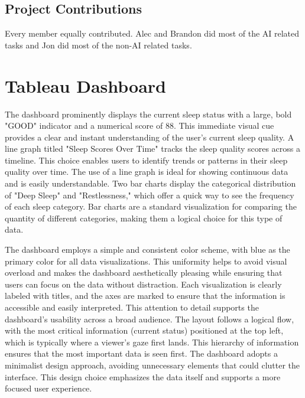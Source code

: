 \documentclass[10pt]{extarticle}
\begin{document}
\subsection{Project Contributions}

Every member equally contributed. Alec and Brandon did most of the AI related tasks and Jon did most of the non-AI related tasks.

\section{Tableau Dashboard}

The dashboard prominently displays the current sleep status with a large, bold "GOOD" indicator and a numerical score of 88. This immediate visual cue provides a clear and instant understanding of the user's current sleep quality. A line graph titled "Sleep Scores Over Time" tracks the sleep quality scores across a timeline. This choice enables users to identify trends or patterns in their sleep quality over time. The use of a line graph is ideal for showing continuous data and is easily understandable. Two bar charts display the categorical distribution of "Deep Sleep" and "Restlessness," which offer a quick way to see the frequency of each sleep category. Bar charts are a standard visualization for comparing the quantity of different categories, making them a logical choice for this type of data.

The dashboard employs a simple and consistent color scheme, with blue as the primary color for all data visualizations. This uniformity helps to avoid visual overload and makes the dashboard aesthetically pleasing while ensuring that users can focus on the data without distraction. Each visualization is clearly labeled with titles, and the axes are marked to ensure that the information is accessible and easily interpreted. This attention to detail supports the dashboard's usability across a broad audience. The layout follows a logical flow, with the most critical information (current status) positioned at the top left, which is typically where a viewer's gaze first lands. This hierarchy of information ensures that the most important data is seen first. The dashboard adopts a minimalist design approach, avoiding unnecessary elements that could clutter the interface. This design choice emphasizes the data itself and supports a more focused user experience.

\newpage

\printbibliography{}

\newpage
\end{document}
